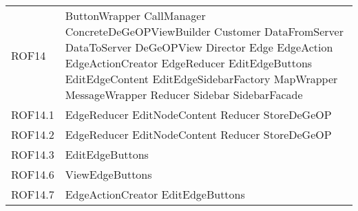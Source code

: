\begin{longtable}{p{2.5cm}!{\VRule[1pt]}p{5cm}}
		ROF14 & ButtonWrapper \newline CallManager \newline ConcreteDeGeOPViewBuilder \newline Customer \newline DataFromServer \newline DataToServer \newline DeGeOPView \newline Director \newline Edge \newline EdgeAction \newline EdgeActionCreator \newline EdgeReducer \newline EditEdgeButtons \newline EditEdgeContent \newline EditEdgeSidebarFactory \newline MapWrapper \newline MessageWrapper \newline Reducer \newline Sidebar \newline SidebarFacade\\
		ROF14.1 & EdgeReducer \newline EditNodeContent \newline Reducer \newline StoreDeGeOP\\
		ROF14.2 & EdgeReducer \newline EditNodeContent \newline Reducer \newline StoreDeGeOP\\
		ROF14.3 & EditEdgeButtons\\
		ROF14.6 & ViewEdgeButtons\\
		ROF14.7 & EdgeActionCreator \newline EditEdgeButtons\\

\end{longtable}
